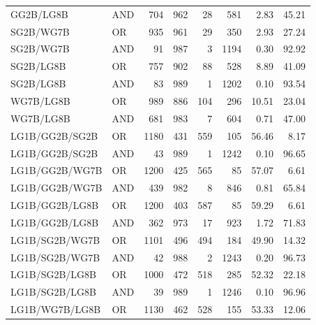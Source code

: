 \documentclass{article}
\begin{document}
{\begin{longtable}{llrrrrrr}
 GG2B/LG8B                & AND     &  704 &  962 &   28 &  581 & 2.83              & 45.21             \\
 SG2B/WG7B                & OR      &  935 &  961 &   29 &  350 & 2.93              & 27.24             \\
 SG2B/WG7B                & AND     &   91 &  987 &    3 & 1194 & 0.30              & 92.92             \\
 SG2B/LG8B                & OR      &  757 &  902 &   88 &  528 & 8.89              & 41.09             \\
 SG2B/LG8B                & AND     &   83 &  989 &    1 & 1202 & 0.10              & 93.54             \\
 WG7B/LG8B                & OR      &  989 &  886 &  104 &  296 & 10.51             & 23.04             \\
 WG7B/LG8B                & AND     &  681 &  983 &    7 &  604 & 0.71              & 47.00             \\
 LG1B/GG2B/SG2B           & OR      & 1180 &  431 &  559 &  105 & 56.46             & 8.17              \\
 LG1B/GG2B/SG2B           & AND     &   43 &  989 &    1 & 1242 & 0.10              & 96.65             \\
 LG1B/GG2B/WG7B           & OR      & 1200 &  425 &  565 &   85 & 57.07             & 6.61              \\
 LG1B/GG2B/WG7B           & AND     &  439 &  982 &    8 &  846 & 0.81              & 65.84             \\
 LG1B/GG2B/LG8B           & OR      & 1200 &  403 &  587 &   85 & 59.29             & 6.61              \\
 LG1B/GG2B/LG8B           & AND     &  362 &  973 &   17 &  923 & 1.72              & 71.83             \\
 LG1B/SG2B/WG7B           & OR      & 1101 &  496 &  494 &  184 & 49.90             & 14.32             \\
 LG1B/SG2B/WG7B           & AND     &   42 &  988 &    2 & 1243 & 0.20              & 96.73             \\
 LG1B/SG2B/LG8B           & OR      & 1000 &  472 &  518 &  285 & 52.32             & 22.18             \\
 LG1B/SG2B/LG8B           & AND     &   39 &  989 &    1 & 1246 & 0.10              & 96.96             \\
 LG1B/WG7B/LG8B           & OR      & 1130 &  462 &  528 &  155 & 53.33             & 12.06             \\

\end{longtable}}
\end{document}
